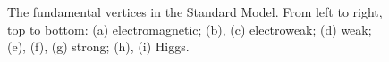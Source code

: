 \begin{figure}[htb]
    \quad
    \quad
    \caption{
        The fundamental vertices in the Standard Model. 
        From left to right, top to bottom: 
        (a) electromagnetic; (b), (c) electroweak; (d) weak; (e), (f), (g) strong; (h), (i) Higgs. 
    }
    \label{fig:sm_vertices}
\end{figure}

